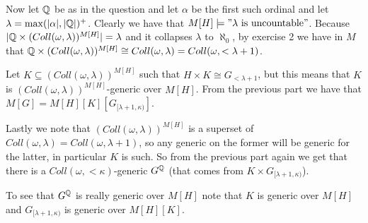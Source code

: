 \begin{cExercise}
\begin{cPart}
		Now let $\mathbb Q$ be as in the question and let $\alpha$ be the first such ordinal and let $\lambda=\max(|\alpha|, |\mathbb Q|)^+$. Clearly we have that $M[H]\models"\lambda\text{ is uncountable}"$. Because $|\mathbb Q\times (Coll(\omega,\lambda))^{M[H]}|=\lambda$ and it collapses $\lambda$ to $\aleph_0$, by exercise 2 we have in $M$ that $\mathbb Q\times (Coll(\omega,\lambda))^{M[H]}\cong Coll(\omega,\lambda)=Coll(\omega,<\lambda+1)$.
		
		Let $K\subseteq (Coll(\omega,\lambda))^{M[H]}$ such that $H\times K\cong G_{<\lambda+1}$, but this means that $K$ is $(Coll(\omega,\lambda))^{M[H]}$-generic over $M[H]$. From the previous part we have that $M[G]=M[H][K][G_{[\lambda+1,\kappa)}]$.
		
		Lastly we note that $(Coll(\omega,\lambda))^{M[H]}$ is a superset of $Coll(\omega,\lambda)=Coll(\omega,\lambda+1)$, so any generic on the former will be generic for the latter, in particular $K$ is such. So from the previous part again we get that there is a $Coll(\omega,<\kappa)$-generic $G^\mathbb Q$ (that comes from $K\times G_{[\lambda+1,\kappa)}$).
		
		To see that $G^\mathbb Q$ is really generic over $M[H]$ note that $K$ is generic over $M[H]$ and $G_{[\lambda+1,\kappa)}$ is generic over $M[H][K]$.
	\end{cPart}
\end{cExercise}








